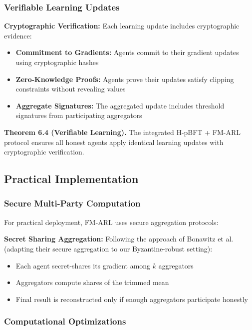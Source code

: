 \documentclass[conference]{IEEEtran}
\begin{document}
\subsubsection{Verifiable Learning Updates}

\textbf{Cryptographic Verification:} Each learning update includes cryptographic evidence:
\begin{itemize}
    \item \textbf{Commitment to Gradients:} Agents commit to their gradient updates using cryptographic hashes
    \item \textbf{Zero-Knowledge Proofs:} Agents prove their updates satisfy clipping constraints without revealing values
    \item \textbf{Aggregate Signatures:} The aggregated update includes threshold signatures from participating aggregators
\end{itemize}

\textbf{Theorem 6.4 (Verifiable Learning).} The integrated H-pBFT + FM-ARL protocol ensures all honest agents apply identical learning updates with cryptographic verification.

\subsection{Practical Implementation}

\subsubsection{Secure Multi-Party Computation}

For practical deployment, FM-ARL uses secure aggregation protocols:

\textbf{Secret Sharing Aggregation:} Following the approach of Bonawitz et al. (adapting their secure aggregation to our Byzantine-robust setting):
\begin{itemize}
    \item Each agent secret-shares its gradient among $k$ aggregators
    \item Aggregators compute shares of the trimmed mean
    \item Final result is reconstructed only if enough aggregators participate honestly
\end{itemize}

\subsubsection{Computational Optimizations}
\end{document}
